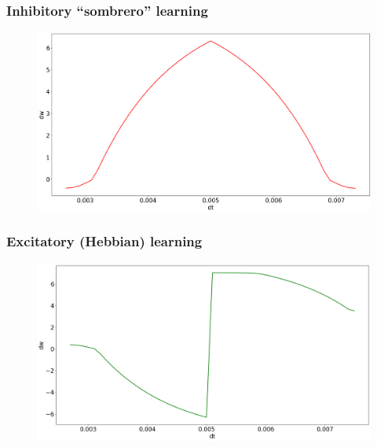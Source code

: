 \documentclass[12pt, aspectratio=169]{beamer}
\begin{document}

\begin{frame}
\frametitle{Inhibitory ``sombrero'' learning}
\begin{figure}
\includegraphics[width=0.9\linewidth]{result_sombrero}
\end{figure}
\end{frame}


\begin{frame}
\frametitle{Excitatory (Hebbian) learning}
\begin{figure}
\includegraphics[width=0.9\linewidth]{result_hebb}
\end{figure}
\end{frame}

\end{document}
